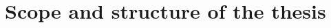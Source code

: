\documentclass[12pt,a4paper,oneside,pdftex]{report}
\begin{document}
%    
%    
\section{Scope and structure of the thesis}
\label{sec:scope}
\end{document}
